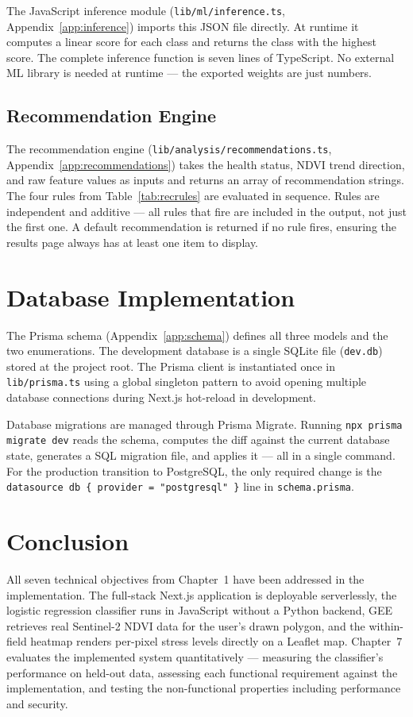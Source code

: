 The JavaScript inference module (\texttt{lib/ml/inference.ts}, Appendix~\ref{app:inference}) imports this JSON file directly. At runtime it computes a linear score for each class and returns the class with the highest score. The complete inference function is seven lines of TypeScript. No external ML library is needed at runtime — the exported weights are just numbers.

\subsection{Recommendation Engine}

The recommendation engine (\texttt{lib/analysis/recommendations.ts}, Appendix~\ref{app:recommendations}) takes the health status, NDVI trend direction, and raw feature values as inputs and returns an array of recommendation strings. The four rules from Table~\ref{tab:recrules} are evaluated in sequence. Rules are independent and additive — all rules that fire are included in the output, not just the first one. A default recommendation is returned if no rule fires, ensuring the results page always has at least one item to display.

\section{Database Implementation}

The Prisma schema (Appendix~\ref{app:schema}) defines all three models and the two enumerations. The development database is a single SQLite file (\texttt{dev.db}) stored at the project root. The Prisma client is instantiated once in \texttt{lib/prisma.ts} using a global singleton pattern to avoid opening multiple database connections during Next.js hot-reload in development.

Database migrations are managed through Prisma Migrate. Running \texttt{npx prisma migrate dev} reads the schema, computes the diff against the current database state, generates a SQL migration file, and applies it — all in a single command. For the production transition to PostgreSQL, the only required change is the \texttt{datasource db \{ provider = "postgresql" \}} line in \texttt{schema.prisma}. \citep{prisma2023}

\section{Conclusion}

All seven technical objectives from Chapter~1 have been addressed in the implementation. The full-stack Next.js application is deployable serverlessly, the logistic regression classifier runs in JavaScript without a Python backend, GEE retrieves real Sentinel-2 NDVI data for the user's drawn polygon, and the within-field heatmap renders per-pixel stress levels directly on a Leaflet map. Chapter~7 evaluates the implemented system quantitatively — measuring the classifier's performance on held-out data, assessing each functional requirement against the implementation, and testing the non-functional properties including performance and security.
